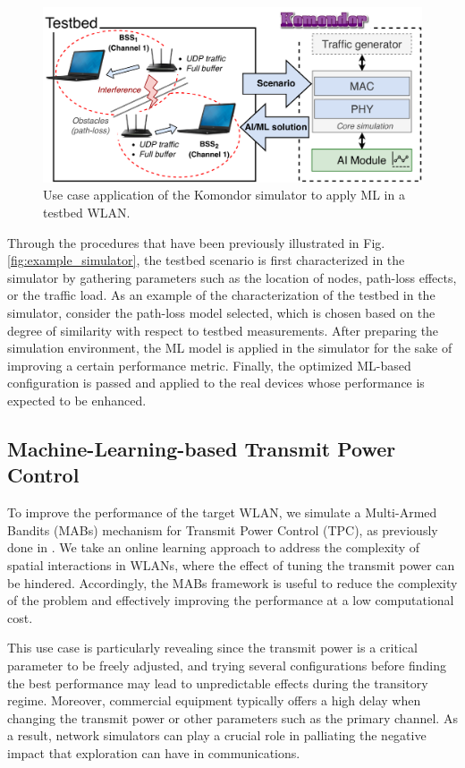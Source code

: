 \documentclass[journal]{IEEEtran}
\begin{document}
	\begin{figure}[ht!]
		\centering
		\includegraphics[width=\columnwidth]{testbed2.pdf}
		\caption{Use case application of the Komondor simulator to apply ML in a testbed WLAN.}
		\label{fig:testbed}
	\end{figure}
	
	Through the procedures that have been previously illustrated in Fig. \ref{fig:example_simulator}, the testbed scenario is first characterized in the simulator by gathering parameters such as the location of nodes, path-loss effects, or the traffic load. As an example of the characterization of the testbed in the simulator, consider the path-loss model selected, which is chosen based on the degree of similarity with respect to testbed measurements. After preparing the simulation environment, the ML model is applied in the simulator for the sake of improving a certain performance metric. Finally, the optimized ML-based configuration is passed and applied to the real devices whose performance is expected to be enhanced.
	
	\subsection{Machine-Learning-based Transmit Power Control}
	To improve the performance of the target WLAN, we simulate a Multi-Armed Bandits (MABs) mechanism for Transmit Power Control (TPC), as previously done in \cite{wilhelmi}. We take an online learning approach to address the complexity of spatial interactions in WLANs, where the effect of tuning the transmit power can be hindered. Accordingly, the MABs framework is useful to reduce the complexity of the problem and effectively improving the performance at a low computational cost. 
	
	This use case is particularly revealing since the transmit power is a critical parameter to be freely adjusted, and trying several configurations before finding the best performance may lead to unpredictable effects during the transitory regime. Moreover, commercial equipment typically offers a high delay when changing the transmit power or other parameters such as the primary channel. As a result, network simulators can play a crucial role in palliating the negative impact that exploration can have in communications.
	
\end{document}
